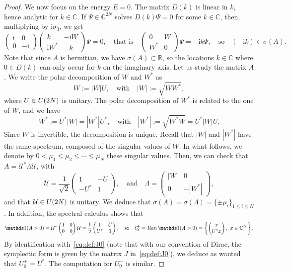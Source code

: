 \documentclass[11pt]{amsart}
\numberwithin{equation}{section} %
\newcommand\1{{\mathds 1}}
\def\C{{\mathbb C}}
\def\R{{\mathbb R}}
\def\ri{{\mathrm{i}}}
\def\cU{{\mathcal U}}
\def\U{{\rm U}}
\def\Ran{{\rm Ran }}
\begin{document}
\begin{proof}
We now focus on the energy $E = 0$. The matrix $D(k)$ is linear in $k$, hence analytic for $k \in \C$. If $\Psi \in \C^{2N}$ solves $D(k) \Psi = 0$ for some $k \in \C$, then, multiplying by $ \ri \sigma_3$, we get
\[
    \begin{pmatrix}
        \ri & 0 \\ 0 & -\ri 
    \end{pmatrix}
    \begin{pmatrix}
        k & - \ri W \\ \ri W^* & - k
    \end{pmatrix} \Psi = 0, \quad \text{that is} \quad
    \begin{pmatrix}
        0 & W \\ W^* & 0
    \end{pmatrix} \Psi = - \ri k \Psi,
    \quad \text{so} \quad (- \ri k) \in \sigma(A).
\]
Note that since $A$ is hermitian, we have $\sigma(A) \subset \R$, so the locations $k \in \C$ where $0 \in D(k)$ can only occur for $k$ on the imaginary axis. Let us study the matrix $A$. We write the polar decomposition of $W$ and $W^*$ as
\[
    W := | W | U, \quad \text{with} \quad | W | := \sqrt{W W^*}, 
\]
where $U \in \U(2N)$ is unitary. The polar decomposition of $W^*$ is related to the one of $W$, and we have
\[
    W^* := U^* | W| = | W^* | U^*, \quad \text{with} \quad | W^* | := \sqrt{W^*W} = U^* | W | U.
\]
Since $W$ is invertible, the decomposition is unique. Recall that $| W |$ and $|W^*| $ have the same spectrum, composed of the singular values of $W$. In what follows, we denote by $0 < \mu_1 \le \mu_2 \le \cdots \le \mu_N$ these singular values. Then, we can check that $A = \cU^* \Lambda \cU$, with
\[
     \cU = \frac{1}{\sqrt{2}}\begin{pmatrix}    1 & - U \\   -  U^* & 1
    \end{pmatrix}, \quad \text{and} \quad
    \Lambda = \begin{pmatrix}
        | W | & 0 \\ 0 & - | W^* |
    \end{pmatrix},
\]
and that $\cU \in \U(2N)$ is unitary. We deduce that $\sigma(A) = \sigma(\Lambda) = \{ \pm \mu_i \}_{1 \le i \le N}$. In addition, the spectral calculus shows that
\[
   \1(A > 0) =  \cU^* \begin{pmatrix}        1 & 0 \\ 0 & 0    \end{pmatrix} \cU 
    = \frac12 \begin{pmatrix}  1 & U \\  U^* & 1    \end{pmatrix}, \quad \text{so} \quad
    \ell_0^+ = \Ran \, \1(A > 0) = \left\{ \begin{pmatrix}
        x \\ U^* x
    \end{pmatrix}, \ x \in \C^N \right\}.
\]
By identification with~\eqref{eq:def:J0} (note that with our convention of Dirac, the symplectic form is given by the matrix $J$ in~\eqref{eq:def:J0}), we deduce as wanted that $U_0^+ = U^*$. The computation for $U_0^-$ is similar.


\end{proof}
\end{document}
